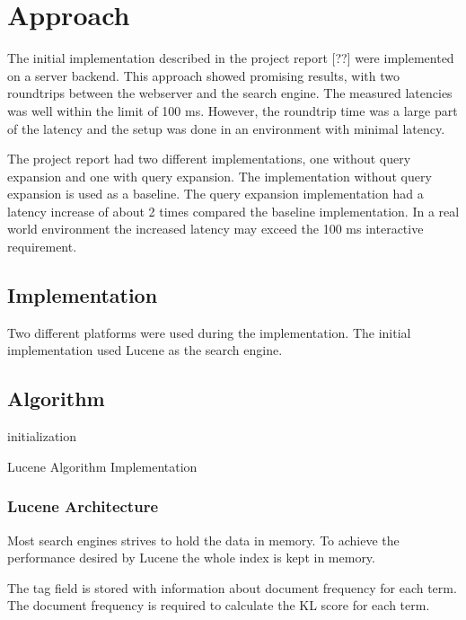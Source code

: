 \chapter{Approach}
\label{ch:approach}
The initial implementation described in the project report [??] were implemented on a server backend.
This approach showed promising results, with two roundtrips between the webserver and the search engine.
The measured latencies was well within the limit of 100 ms.
However, the roundtrip time was a large part of the latency and the setup was done in an environment with minimal latency.

The project report had two different implementations, one without query expansion and one with query expansion.
The implementation without query expansion is used as a baseline.
The query expansion implementation had a latency increase of about 2 times compared the baseline implementation.
In a real world environment the increased latency may exceed the 100 ms interactive requirement.

\section{Implementation}
Two different platforms were used during the implementation.
The initial implementation used Lucene as the search engine.

\section{Algorithm}
\begin{algorithm}[H]
 initialization\;

 \caption{Lucene Algorithm Implementation}
\end{algorithm}

\subsection{Lucene Architecture}
Most search engines strives to hold the data in memory.
To achieve the performance desired by Lucene the whole index is kept in memory.

The tag field is stored with information about document frequency for each term.
The document frequency is required to calculate the KL score for each term.

